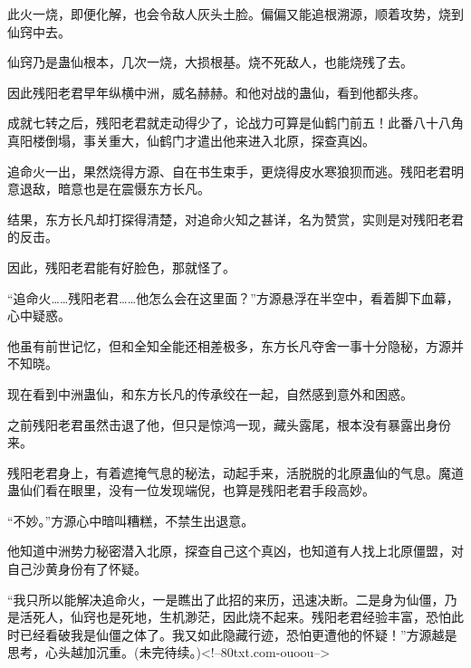 \begin{this_body}
此火一烧，即便化解，也会令敌人灰头土脸。偏偏又能追根溯源，顺着攻势，烧到仙窍中去。

仙窍乃是蛊仙根本，几次一烧，大损根基。烧不死敌人，也能烧残了去。

因此残阳老君早年纵横中洲，威名赫赫。和他对战的蛊仙，看到他都头疼。

成就七转之后，残阳老君就走动得少了，论战力可算是仙鹤门前五！此番八十八角真阳楼倒塌，事关重大，仙鹤门才遣出他来进入北原，探查真凶。

追命火一出，果然烧得方源、自在书生束手，更烧得皮水寒狼狈而逃。残阳老君明意退敌，暗意也是在震慑东方长凡。

结果，东方长凡却打探得清楚，对追命火知之甚详，名为赞赏，实则是对残阳老君的反击。

因此，残阳老君能有好脸色，那就怪了。

“追命火……残阳老君……他怎么会在这里面？”方源悬浮在半空中，看着脚下血幕，心中疑惑。

他虽有前世记忆，但和全知全能还相差极多，东方长凡夺舍一事十分隐秘，方源并不知晓。

现在看到中洲蛊仙，和东方长凡的传承绞在一起，自然感到意外和困惑。

之前残阳老君虽然击退了他，但只是惊鸿一现，藏头露尾，根本没有暴露出身份来。

残阳老君身上，有着遮掩气息的秘法，动起手来，活脱脱的北原蛊仙的气息。魔道蛊仙们看在眼里，没有一位发现端倪，也算是残阳老君手段高妙。

“不妙。”方源心中暗叫糟糕，不禁生出退意。

他知道中洲势力秘密潜入北原，探查自己这个真凶，也知道有人找上北原僵盟，对自己沙黄身份有了怀疑。

“我只所以能解决追命火，一是瞧出了此招的来历，迅速决断。二是身为仙僵，乃是活死人，仙窍也是死地，生机渺茫，因此烧不起来。残阳老君经验丰富，恐怕此时已经看破我是仙僵之体了。我又如此隐藏行迹，恐怕更遭他的怀疑！”方源越是思考，心头越加沉重。(未完待续。)<!--80txt.com-ouoou-->

\end{this_body}

